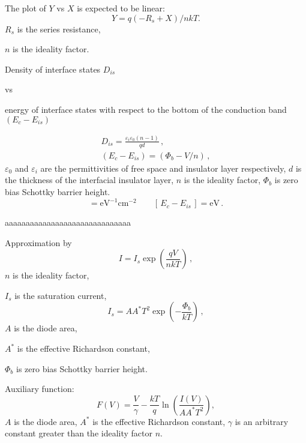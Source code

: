 \documentclass[14pt]{article}
\numberwithin{equation}{part}
\begin{document}
The plot of $Y$ vs $X$ is expected to be linear:
\begin{equation*}
Y=q(-R_s+X)/nkT.
\end{equation*}
$R_s$ is the series resistance,

\noindent
$n$ is the ideality factor.

\pagebreak

\begin{center}
Density of interface states $D_{is}$


   vs


energy of interface states with respect to the bottom of the conduction band $(E_c-E_{is})$
\end{center}
\vspace{-8mm}
\begin{eqnarray*}
D_{is}=\frac{\varepsilon_i\varepsilon_0(n-1)}{qd}\,,
\\
(E_c-E_{is})=(\Phi_b-V/n)\,,
\end{eqnarray*}
$\varepsilon_0$ and $\varepsilon_i$ are the permittivities of free space and insulator layer respectively,
$d$ is the thickness of the interfacial insulator layer,
$n$ is the ideality factor,
$\Phi_b$ is zero bias Schottky barrier height.
\begin{equation*}
[\,D_{is}\,]=\text{eV}^{-1}\text{cm}^{-2}\qquad [\,E_c-E_{is}\,]=\text{eV}\,.
\end{equation*}



\vspace{5mm}
aaaaaaaaaaaaaaaaaaaaaaaaaaaaaa
\vspace{5mm}

Approximation by
\begin{equation*}
I=I_s\exp\left(\frac{qV}{nkT}\right)\,,
\end{equation*}
$n$ is the ideality factor,

\noindent
$I_s$ is the saturation current,
\begin{equation*}
I_s=AA^*T^2\exp\left(-\frac{\Phi_b}{kT}\right)\,,
\end{equation*}
$A$ is the diode area,

\noindent
$A^*$ is the effective Richardson constant,

\noindent
$\Phi_b$ is zero bias Schottky barrier height.


\pagebreak

Auxiliary  function:
\begin{equation*}
F(V)=\frac{V}{\gamma}-\frac{kT}{q}\ln\left(\frac{I(V)}{AA^*T^2}\right),
\end{equation*}
$A$ is the diode area,
$A^*$ is the effective Richardson constant,
$\gamma$ is an arbitrary constant greater than the ideality factor $n$.
\end{document}
